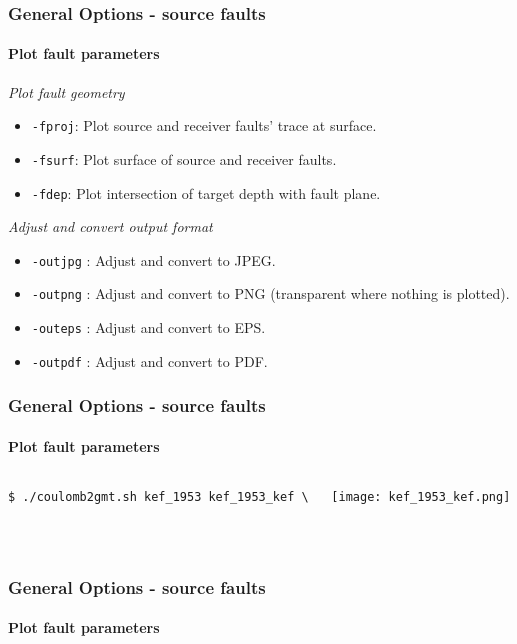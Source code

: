 \begin{frame}
  \frametitle{General Options - source faults}
  \framesubtitle{Plot fault parameters}
  \label{fr4:hist_pics}

\emph{Plot fault geometry}

\begin{scriptsize}
\begin{itemize}
\item
  \texttt{-fproj}: Plot source and receiver faults' trace at surface.
\item
  \texttt{-fsurf}: Plot surface of source and receiver faults.
\item
  \texttt{-fdep}: Plot intersection of target depth with fault plane.
\end{itemize}
\end{scriptsize}

\emph{Adjust and convert output format}
\begin{scriptsize}
\begin{itemize}
\item
  \texttt{-outjpg} : Adjust and convert to JPEG.
\item
  \texttt{-outpng} : Adjust and convert to PNG (transparent where
  nothing is plotted).
\item
  \texttt{-outeps} : Adjust and convert to EPS.
\item
  \texttt{-outpdf} : Adjust and convert to PDF.
\end{itemize}
\end{scriptsize}
\end{frame}
\note{}


\begin{frame}[t,fragile]
  \frametitle{General Options - source faults}
  \framesubtitle{Plot fault parameters}
  \label{fr4:hist_pics}
\begin{columns}[t]
  \begin{column}{.4\textwidth}
\begin{scriptsize}
\begin{verbatim}
$ ./coulomb2gmt.sh kef_1953 kef_1953_kef \
                    
           

\end{verbatim}
\end{scriptsize}
  \end{column}
  \begin{column}{.6\textwidth}
  \texttt{[image: kef\_1953\_kef.png]}
  \end{column}
\end{columns}

\end{frame}
\note{}

\begin{frame}
  \frametitle{General Options - source faults}
  \framesubtitle{Plot fault parameters}
  \label{fr4:hist_pics}

\end{frame}
\note{}









